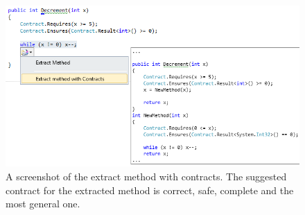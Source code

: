 \documentclass{llncs}
\begin{document}
\begin{figure}[t]
\includegraphics[width=\columnwidth]{2-RefactoredRoslyn}
\caption{A screenshot of the  extract method with contracts.
The suggested contract for the extracted method is  correct, safe, complete and the most general one.}
\label{ExtractMethodWithContracts}
\vspace{-0.5cm}
\end{figure}



\end{document}
